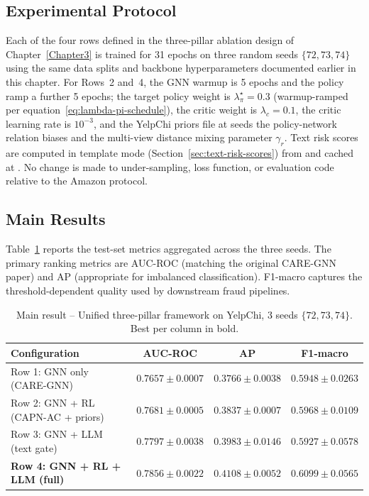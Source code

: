 \subsection{Experimental Protocol}
\label{sec:yelp-main-protocol}

Each of the four rows defined in the three-pillar ablation design of Chapter~\ref{Chapter3} is trained for 31 epochs on three random seeds $\{72, 73, 74\}$ using the same data splits and backbone hyperparameters documented earlier in this chapter. For Rows~2 and~4, the GNN warmup is 5 epochs and the policy ramp a further 5 epochs; the target policy weight is $\lambda_\pi^{\star} = 0.3$ (warmup-ramped per equation~\eqref{eq:lambda-pi-schedule}), the critic weight is $\lambda_c = 0.1$, the critic learning rate is $10^{-3}$, and the YelpChi priors file at  seeds the policy-network relation biases and the multi-view distance mixing parameter $\gamma_r$. Text risk scores are computed in template mode (Section~\ref{sec:text-risk-scores}) from  and cached at . No change is made to under-sampling, loss function, or evaluation code relative to the Amazon protocol.

\subsection{Main Results}
\label{sec:yelp-main-table}

Table~\ref{tab:main-framework-yelp} reports the test-set metrics aggregated across the three seeds. The primary ranking metrics are AUC-ROC (matching the original CARE-GNN paper) and AP (appropriate for imbalanced classification). F1-macro captures the threshold-dependent quality used by downstream fraud pipelines.

\begin{table}[h!]
\centering
\begin{tabular}{lccc}
\toprule
\textbf{Configuration} & \textbf{AUC-ROC} & \textbf{AP} & \textbf{F1-macro} \\
\midrule
Row 1: GNN only (CARE-GNN)          & $0.7657 \pm 0.0007$ & $0.3766 \pm 0.0038$ & $0.5948 \pm 0.0263$ \\
Row 2: GNN + RL (CAPN-AC + priors)  & $0.7681 \pm 0.0005$ & $0.3837 \pm 0.0007$ & $0.5968 \pm 0.0109$ \\
Row 3: GNN + LLM (text gate)        & $0.7797 \pm 0.0038$ & $0.3983 \pm 0.0146$ & $0.5927 \pm 0.0578$ \\
\textbf{Row 4: GNN + RL + LLM (full)} & $\mathbf{0.7856 \pm 0.0022}$ & $\mathbf{0.4108 \pm 0.0052}$ & $\mathbf{0.6099 \pm 0.0565}$ \\
\bottomrule
\end{tabular}
\caption{Main result -- Unified three-pillar framework on YelpChi, 3 seeds $\{72, 73, 74\}$. Best per column in bold.}
\label{tab:main-framework-yelp}
\end{table}

